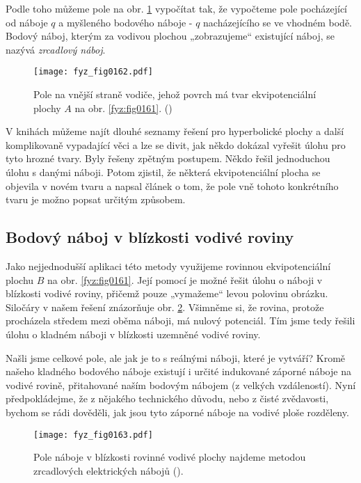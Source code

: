   Podle toho můžeme pole na obr. \ref{fyz:fig0162} vypočítat tak, že vypočteme pole pocházející od
  náboje \(q\) a myšleného bodového náboje - \(q\) nacházejícího se ve vhodném bodě. Bodový náboj,
  kterým za vodivou plochou „zobrazujeme“ existující náboj, se nazývá \emph{zrcadlový náboj}.

  \begin{figure}[ht!]  %
    \centering
    \texttt{[image: fyz\_fig0162.pdf]}
    \caption{Pole na vnější straně vodiče, jehož povrch má tvar ekvipotenciální plochy \(A\) na 
             obr. \ref{fyz:fig0161}.
             (\cite[s.~110]{Feynman02})}
    \label{fyz:fig0162}
  \end{figure}
  
  V knihách můžeme najít dlouhé seznamy řešení pro hyperbolické plochy a další komplikovaně
  vypadající věci a lze se divit, jak někdo dokázal vyřešit úlohu pro tyto hrozné tvary. Byly řešeny
  zpětným postupem. Někdo řešil jednoduchou úlohu s danými náboji. Potom zjistil, že některá
  ekvipotenciální plocha se objevila v novém tvaru a napsal článek o tom, že pole vně tohoto
  konkrétního tvaru je možno popsat určitým způsobem.
  
  \subsection{Bodový náboj v blízkosti vodivé roviny} %
    Jako nejjednodušší aplikaci této metody využijeme rovinnou ekvipotenciální plochu \(B\) na obr.
    \ref{fyz:fig0161}. Její pomocí je možné řešit úlohu o náboji v blízkosti vodivé roviny, přičemž
    pouze „vymažeme“ levou polovinu obrázku. Siločáry v našem řešení znázorňuje obr.
    \ref{fyz:fig0163}. Všimněme si, že rovina, protože procházela středem mezi oběma náboji, má
    nulový potenciál. Tím jsme tedy řešili úlohu o kladném náboji v blízkosti uzemněné vodivé
    roviny.
    
    Našli jsme celkové pole, ale jak je to s reálnými náboji, které je vytváří? Kromě našeho
    kladného bodového náboje existují i určité indukované záporné náboje na vodivé rovině,
    přitahované naším bodovým nábojem (z velkých vzdáleností). Nyní předpokládejme, že z nějakého
    technického důvodu, nebo z čisté zvědavosti, bychom se rádi dověděli, jak jsou tyto záporné
    náboje na vodivé ploše rozděleny.
    
    \begin{figure}[ht!]  %
      \centering
      \texttt{[image: fyz\_fig0163.pdf]}
      \caption{Pole náboje v blízkosti rovinné vodivé plochy najdeme metodou zrcadlových 
               elektrických nábojů (\cite[s.~111]{Feynman02}).}
      \label{fyz:fig0163}
    \end{figure}
    
